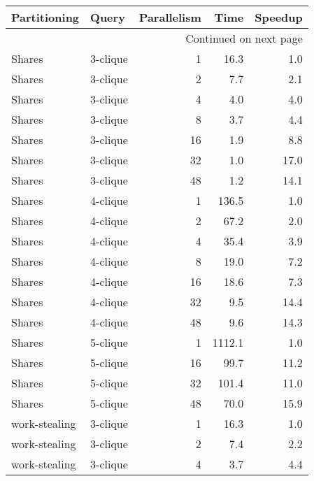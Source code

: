 \begin{longtable}{llr|rr}
\toprule
  Partitioning &     Query &  Parallelism &    Time &  Speedup \\
\midrule
\endhead
\midrule
\multicolumn{5}{r}{{Continued on next page}} \\
\midrule
\endfoot

\bottomrule
\endlastfoot
        Shares &  3-clique &            1 &    16.3 &      1.0 \\
        Shares &  3-clique &            2 &     7.7 &      2.1 \\
        Shares &  3-clique &            4 &     4.0 &      4.0 \\
        Shares &  3-clique &            8 &     3.7 &      4.4 \\
        Shares &  3-clique &           16 &     1.9 &      8.8 \\
        Shares &  3-clique &           32 &     1.0 &     17.0 \\
        Shares &  3-clique &           48 &     1.2 &     14.1 \\
        Shares &  4-clique &            1 &   136.5 &      1.0 \\
        Shares &  4-clique &            2 &    67.2 &      2.0 \\
        Shares &  4-clique &            4 &    35.4 &      3.9 \\
        Shares &  4-clique &            8 &    19.0 &      7.2 \\
        Shares &  4-clique &           16 &    18.6 &      7.3 \\
        Shares &  4-clique &           32 &     9.5 &     14.4 \\
        Shares &  4-clique &           48 &     9.6 &     14.3 \\
        Shares &  5-clique &            1 &  1112.1 &      1.0 \\
        Shares &  5-clique &           16 &    99.7 &     11.2 \\
        Shares &  5-clique &           32 &   101.4 &     11.0 \\
        Shares &  5-clique &           48 &    70.0 &     15.9 \\
 work-stealing &  3-clique &            1 &    16.3 &      1.0 \\
 work-stealing &  3-clique &            2 &     7.4 &      2.2 \\
 work-stealing &  3-clique &            4 &     3.7 &      4.4 \\

\end{longtable}
